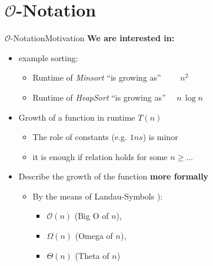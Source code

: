 
\section{\texorpdfstring{$\mathcal{O}$}{O}-Notation}


\begin{frame}{$\mathcal{O}$-Notation}{Motivation}
  \textbf{We are interested in:}
  \begin{itemize}
  \item example sorting:
    \begin{itemize}
      \item
        Runtime of \textit{Minsort} \enquote{is growing as}
        $\quad{}\quad{}n^2$
      \item
         Runtime of \textit{HeapSort} \enquote{is growing as}
         $\quad{}n \, \log n$
    \end{itemize}
    \item<2- |handout:1>
      Growth of a function in runtime $T(n)$
      \begin{itemize}
      \item The role of constants (e.g. $1ns$) is minor
      \item it is enough if relation holds for some $n\geq \ldots$
      \end{itemize}
    \item<3- |handout:1>
      Describe the growth of the function \textbf{more formally}
    \begin{itemize}
      \item
        By the means of Landau-Symbols \cite{wikipedia_big_o_notation}):
            \begin{itemize}
                \item
                    {\color{Mittel-Blau}$\mathcal{O}(n)$} (Big O of $n$),
                \item
                    {\color{Mittel-Blau}$\Omega (n)$} (Omega of $n$),
                \item
                    {\color{Mittel-Blau}$\Theta (n)$} (Theta of $n$)
            \end{itemize}
    \end{itemize}
  \end{itemize}
\end{frame}


